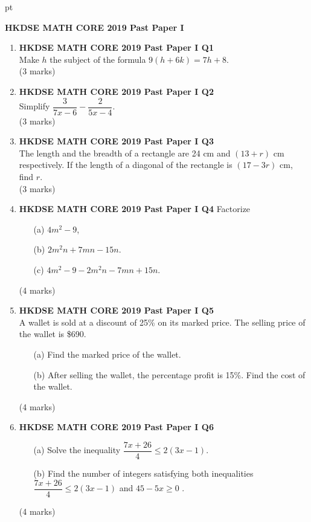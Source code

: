\documentclass[12pt]{article}
\begin{document}
 pt
\begin{center}
	{\large \bf HKDSE MATH CORE 2019 Past Paper I}\\
	\vspace{2 mm}

\end{center}
\vspace{0.05cm}

\begin{enumerate}
	\item \textbf{HKDSE MATH CORE 2019 Past Paper I Q1}\\
	Make $h$ the subject of the formula $9(h + 6k) = 7h + 8$. \\(3 marks)

	\item \textbf{HKDSE MATH CORE 2019 Past Paper I Q2}\\
	Simplify $\dfrac{3}{7x - 6} - \dfrac{2}{5x - 4}$. \\(3 marks)

	\item \textbf{HKDSE MATH CORE 2019 Past Paper I Q3}\\
	The length and the breadth of a rectangle are 24 cm and $(13 + r)$ cm respectively. If the length of a diagonal of the rectangle is $(17 - 3r)$ cm, find $r$. \\(3 marks)

	\item \textbf{HKDSE MATH CORE 2019 Past Paper I Q4}
	Factorize
	\begin{enumerate}
		\item[(a)] $4m^2 - 9$,
		\item[(b)] $2m^2n + 7mn - 15n$.
		\item[(c)] $4m^2 - 9 - 2m^2n - 7mn + 15n$.
	\end{enumerate}
	(4 marks)

	\item \textbf{HKDSE MATH CORE 2019 Past Paper I Q5}\\
	A wallet is sold at a discount of 25\% on its marked price. The selling price of the wallet is \$690.
	\begin{enumerate}
		\item[(a)] Find the marked price of the wallet.
		\item[(b)] After selling the wallet, the percentage profit is 15\%. Find the cost of the wallet.
	\end{enumerate}
	(4 marks)

	\item \textbf{HKDSE MATH CORE 2019 Past Paper I Q6}
	\begin{enumerate}
		\item[(a)] Solve the inequality $\dfrac{7x + 26}{4} \leq 2(3x - 1)$.
		\item[(b)] Find the number of integers satisfying both inequalities $\dfrac{7x + 26}{4} \leq 2(3x - 1)$ and $45 - 5x \geq 0$ .	
	\end{enumerate}
	(4 marks)


\end{enumerate}
\end{document}
